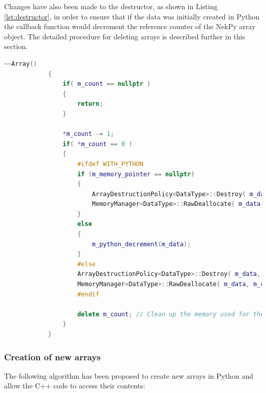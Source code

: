 Changes have also been made to the destructor, as shown in Listing \ref{lst:destructor}, 
in order to ensure that if the data was initially created in Python the callback function 
would decrement the reference counter of the NekPy array object. The detailed procedure 
for deleting arrays is described further in this section.

\begin{lstlisting}[caption={The modified destructor for C++ arrays.}, label={lst:destructor}, language=C++]
~~Array()
            {
                if( m_count == nullptr )
                {
                    return;
                }

                *m_count -= 1;
                if( *m_count == 0 )
                {
                    #ifdef WITH_PYTHON
                    if (m_memory_pointer == nullptr)
                    {
                        ArrayDestructionPolicy<DataType>::Destroy( m_data, m_capacity );
                        MemoryManager<DataType>::RawDeallocate( m_data, m_capacity );
                    }
                    else
                    {
                        m_python_decrement(m_data);
                    }
                    #else
                    ArrayDestructionPolicy<DataType>::Destroy( m_data, m_capacity );
                    MemoryManager<DataType>::RawDeallocate( m_data, m_capacity );
                    #endif
                  
                    delete m_count; // Clean up the memory used for the reference count.
                }
            }
\end{lstlisting}

\subsubsection{Creation of new arrays}

The following algorithm has been proposed to create new arrays in Python and allow the 
C++ code to access their contents:

